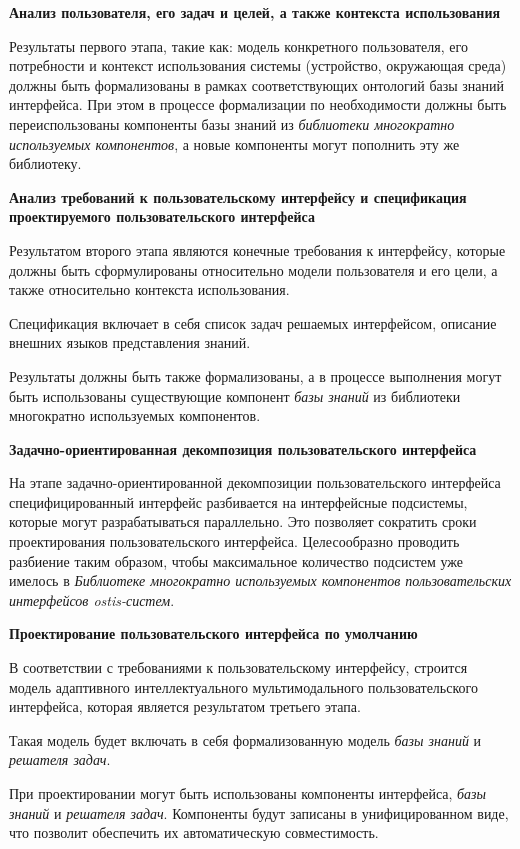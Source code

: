 \textbf{Анализ пользователя, его задач и целей, а также контекста использования}

Результаты первого этапа, такие как: модель конкретного пользователя, его потребности и контекст использования системы (устройство, окружающая среда) должны быть формализованы в рамках соответствующих онтологий базы знаний интерфейса. 
При этом в процессе формализации по необходимости должны быть переиспользованы компоненты базы знаний из \textit{библиотеки многократно используемых компонентов}, а новые компоненты могут пополнить эту же библиотеку.

\textbf{Анализ требований к пользовательскому интерфейсу и спецификация проектируемого пользовательского интерфейса}

Результатом второго этапа являются конечные требования к интерфейсу, которые должны быть сформулированы относительно модели пользователя и его цели, а также относительно контекста использования.

Спецификация включает в себя список задач решаемых интерфейсом, описание
внешних языков представления знаний.

Результаты должны быть также формализованы, а в процессе выполнения могут быть использованы существующие компонент \textit{базы знаний} из библиотеки многократно используемых компонентов.

\textbf{Задачно-ориентированная декомпозиция пользовательского интерфейса}

На этапе задачно-ориентированной декомпозиции пользовательского интерфейса специфицированный интерфейс разбивается на интерфейсные подсистемы, которые могут разрабатываться
параллельно. Это позволяет сократить сроки проектирования пользовательского интерфейса.
Целесообразно проводить разбиение таким образом, чтобы максимальное количество подсистем уже имелось в \textit{Библиотеке многократно используемых компонентов пользовательских интерфейсов ostis-систем}.

\textbf{Проектирование пользовательского интерфейса по умолчанию}

В соответствии с требованиями к пользовательскому интерфейсу, строится модель адаптивного интеллектуального мультимодального пользовательского интерфейса, которая является результатом третьего этапа.

Такая модель будет включать в себя формализованную модель \textit{базы знаний} и \textit{решателя задач}.

При проектировании могут быть использованы компоненты интерфейса, \textit{базы знаний} и \textit{решателя задач}. 
Компоненты будут записаны в унифицированном виде, что позволит обеспечить их автоматическую совместимость.

